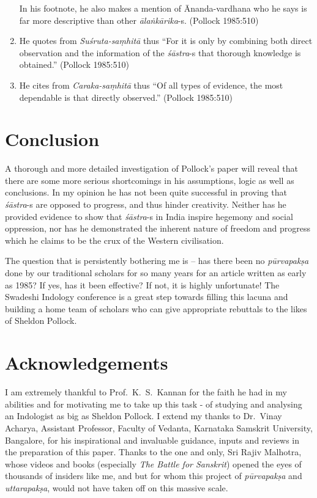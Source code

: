 \begin{enumerate}
In his footnote, he also makes a mention of Ānanda-vardhana who he says is far more descriptive than other {\it ālaṅkārika}-s. (Pollock 1985:510)

\item He quotes from \textsl{Suśruta-saṃhitā} thus ``For it is only by combining both direct observation and the information of the {\it śāstra}-s that thorough knowledge is obtained.'' (Pollock 1985:510)

\item He cites from \textsl{Caraka-saṃhitā} thus ``Of all types of evidence, the most dependable is that directly observed.'' (Pollock 1985:510)
\end{enumerate}

\section*{Conclusion}

A thorough and more detailed investigation of Pollock's paper will reveal that there are some more serious shortcomings in his assumptions, logic as well as conclusions. In my opinion he has not been quite successful in proving that {\it śāstra}-s are opposed to progress, and thus hinder creativity. Neither has he provided evidence to show that {\it śāstra}-s in India inspire hegemony and social oppression, nor has he demonstrated the inherent nature of freedom and progress which he claims to be the crux of the Western civilisation.

The question that is persistently bothering me is -- has there been no {\it pūrvapakṣa} done by our traditional scholars for so many years for an article written as early as 1985? If yes, has it been effective? If not, it is highly unfortunate! The Swadeshi Indology conference is a great step towards filling this lacuna and building a home team of scholars who can give appropriate rebuttals to the likes of Sheldon Pollock.

\section*{Acknowledgements}

I am extremely thankful to Prof.~K.~S.~Kannan for the faith he had in my abilities and for motivating me to take up this task - of studying and analysing an Indologist as big as Sheldon Pollock. I extend my thanks to Dr.~Vinay Acharya, Assistant Professor, Faculty of Vedanta, Karnataka Samskrit University, Bangalore, for his inspirational and invaluable guidance, inputs and reviews in the preparation of this paper. Thanks to the one and only, Sri Rajiv Malhotra, whose videos and books (especially \textsl{The Battle for Sanskrit}) opened the eyes of thousands of insiders like me, and but for whom this project of {\it pūrvapakṣa} and {\it uttarapakṣa}, would not have taken off on this massive scale.

